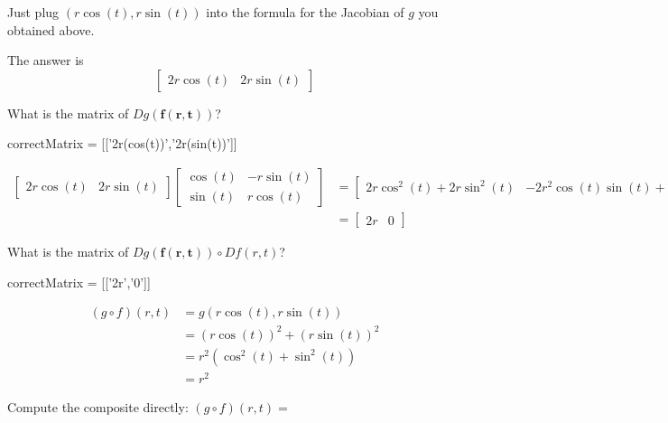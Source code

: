 \documentclass{ximera}
\begin{document}
\begin{question}
	\begin{solution}
		\begin{hint}
			Just plug $(r\cos(t),r\sin(t))$ into the formula for the Jacobian of $g$ you obtained above.
		\end{hint}
		\begin{hint}
			The answer is \[\begin{bmatrix} 2r\cos(t) &2r\sin(t)\end{bmatrix}\]
		\end{hint}
		What is the matrix of $Dg(\mathbf{f(r,t)})$?
		\begin{matrix-answer}
			correctMatrix = [['2r(cos(t))','2r(sin(t))']]
		\end{matrix-answer}
	\end{solution}
	
	\begin{solution}
		\begin{hint}
			\begin{align*}
			\begin{bmatrix} 2r\cos(t) &2r\sin(t)\end{bmatrix} \begin{bmatrix}  
			\cos(t) & -r\sin(t)
			\\  
			\sin(t) & r\cos(t)
			\end{bmatrix} 
			&= \begin{bmatrix} 2r\cos^2(t) + 2r\sin^2(t)  & -2r^2\cos(t)\sin(t)+2r^2\sin(t)\cos(t) \end{bmatrix}\\
			&= \begin{bmatrix} 2r & 0\end{bmatrix}
			\end{align*}
		\end{hint}
		What is the matrix of $Dg(\mathbf{f(r,t)}) \circ Df(r,t)$?
			\begin{matrix-answer}
				correctMatrix = [['2r','0']]
			\end{matrix-answer}
	\end{solution}
	
	\begin{solution}
		\begin{hint}
			\begin{align*}
				(g \circ f)(r,t) &= g(r\cos(t),r\sin(t))\\
				 &=(r\cos(t))^2+(r\sin(t))^2\\
				 &=r^2(\cos^2(t)+\sin^2(t))\\
				 &=r^2
			\end{align*}
		\end{hint}
		Compute the composite directly: $(g \circ f)(r,t) =$\answer{$r^2$}
	\end{solution}
	

\end{question}
\end{document}

